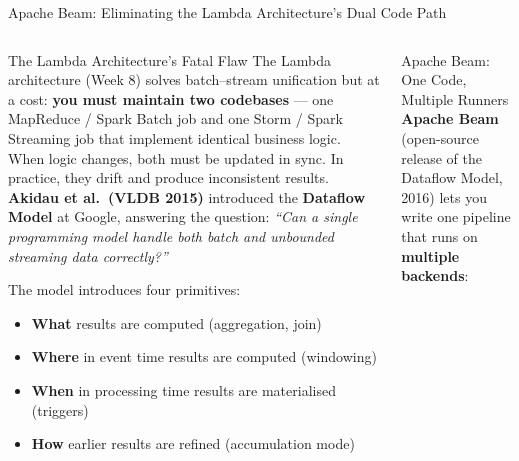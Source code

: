 \documentclass[aspectratio=169,10pt]{beamer}
\begin{document}
\begin{frame}{Apache Beam: Eliminating the Lambda Architecture's Dual Code Path}
  \begin{columns}[T]
      \begin{block}{The Lambda Architecture's Fatal Flaw}
        The Lambda architecture (Week 8) solves batch--stream unification but at a cost: \textbf{you must maintain two codebases} --- one MapReduce / Spark Batch job and one Storm / Spark Streaming job that implement identical business logic.  When logic changes, both must be updated in sync.  In practice, they drift and produce inconsistent results.
        \vspace{4pt}
        \textbf{Akidau et al.\ (VLDB 2015)} introduced the \textbf{Dataflow Model} at Google, answering the question: \textit{``Can a single programming model handle both batch and unbounded streaming data correctly?''}

        The model introduces four primitives:
        \begin{itemize}
          \item \textbf{What} results are computed (aggregation, join)
          \item \textbf{Where} in event time results are computed (windowing)
          \item \textbf{When} in processing time results are materialised (triggers)
          \item \textbf{How} earlier results are refined (accumulation mode)
        \end{itemize}
      \end{block}

      \begin{exampleblock}{Apache Beam: One Code, Multiple Runners}
        \small \textbf{Apache Beam} (open-source release of the Dataflow Model, 2016) lets you write one pipeline that runs on \textbf{multiple backends}:
        \vspace{4pt}
        \begin{center}
\end{center}
\end{exampleblock}
\end{columns}
\end{frame}
\end{document}
